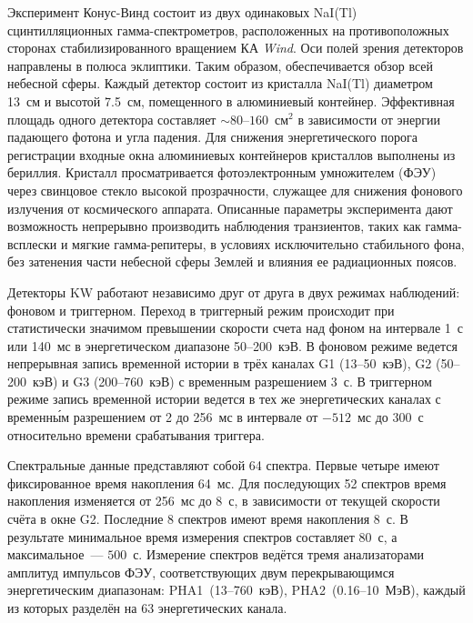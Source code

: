 Эксперимент Конус-Винд состоит из двух одинаковых NaI(Tl) сцинтилляционных 
гамма-спектрометров, расположенных на противоположных сторонах стабилизированного 
вращением КА \textit{Wind}. Оси полей зрения детекторов 
направлены в полюса эклиптики. Таким образом, обеспечивается обзор всей небесной сферы. 
Каждый детектор состоит из кристалла NaI(Tl) диаметром 13~см и высотой 7.5~см, 
помещенного в алюминиевый контейнер.
Эффективная площадь одного детектора составляет $\sim 80\textrm{--}160$~см$^2$ в 
зависимости от энергии падающего фотона и угла падения.  
Для снижения энергетического порога регистрации входные окна алюминиевых 
контейнеров кристаллов выполнены из бериллия. 
Кристалл просматривается фотоэлектронным 
умножителем (ФЭУ) через свинцовое стекло высокой прозрачности, служащее для снижения фонового 
излучения от космического аппарата. Описанные параметры эксперимента дают 
возможность непрерывно производить наблюдения транзиентов, таких как гамма-всплески 
и мягкие гамма-репитеры, в условиях исключительно стабильного фона, 
без затенения части небесной сферы Землей и влияния ее радиационных поясов. 

Детекторы KW работают независимо друг от друга в двух режимах наблюдений: 
фоновом и триггерном. Переход в триггерный режим происходит при статистически 
значимом превышении скорости счета над фоном на интервале 1~с или 140~мс 
в энергетическом диапазоне 50--200~кэВ. В фоновом режиме ведется 
непрерывная запись временной истории в трёх каналах G1 (13--50~кэВ), G2 (50--200~кэВ) 
и G3 (200--760~кэВ) с временным разрешением $3$~с. В триггерном режиме запись 
временной истории ведется в тех же энергетических каналах с временн\'{ы}м разрешением 
от 2 до 256~мс в интервале от $-512$~мс до $300$~с относительно времени срабатывания 
триггера.

Спектральные данные представляют собой 64 спектра. Первые четыре имеют фиксированное время накопления 64~мс.
Для последующих 52 спектров время накопления изменяется от 256~мс до $8$~с, 
в зависимости от текущей скорости счёта в окне G2. Последние 8 спектров имеют время накопления $8$~с. 
В результате минимальное время измерения спектров составляет $80$~с, а максимальное~--- $500$~с.
Измерение спектров ведётся тремя анализаторами амплитуд импульсов ФЭУ, соответствующих
двум перекрывающимся энергетическим диапазонам:  
PHA1~(13--760~кэВ), PHA2~(0.16--10~МэВ), каждый из которых 
разделён на 63 энергетических канала.

